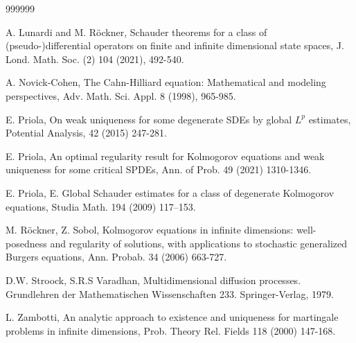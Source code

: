 \documentclass[preprint]{imsart}
\begin{document}
\begin{thebibliography}  {999999}
{ A. Lunardi and M. R\"ockner, Schauder theorems for a class of (pseudo-)differential operators on finite and infinite dimensional state spaces, 
  J. Lond. Math. Soc. (2) 104 (2021),    492-540. 



 A. Novick-Cohen, The Cahn-Hilliard equation: Mathematical and modeling perspectives, Adv. Math. Sci. Appl. 8 (1998), 965-985.






 E. Priola, On weak uniqueness for some degenerate SDEs by global $L^p$ estimates, { Potential Analysis,} 42 (2015) 247-281.

 

 

 E. Priola, An optimal regularity result for Kolmogorov equations and weak uniqueness for some critical SPDEs, Ann. of Prob. 49
(2021)  1310-1346.   
 

  E.  Priola, E. Global Schauder estimates for a class of degenerate Kolmogorov equations, Studia Math. 194 (2009) 117–153.
 

 M. R\"{o}ckner, Z. Sobol,
 Kolmogorov equations in infinite dimensions: well-posedness and regularity of solutions, with applications to stochastic generalized Burgers equations, Ann. Probab. 34 (2006) 663-727.

 


  D.W. Stroock, 
 S.R.S Varadhan,  Multidimensional diffusion
processes. Grundlehren der Mathematischen Wissenschaften
 233. Springer-Verlag, 1979.


 L. Zambotti, An       analytic approach to existence and uniqueness for martingale problems in infinite dimensions, Prob. Theory Rel. Fields 118 (2000)  147-168.

} 
\end{thebibliography}
\end{document}
